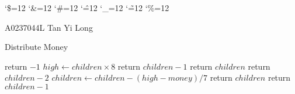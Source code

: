 \documentclass[a4paper,11pt]{article}
\newenvironment{simplechar}{%
   \catcode`\$=12
   \catcode`\&=12
   \catcode`\#=12
   \catcode`\^=12
   \catcode`\_=12
   \catcode`\~=12
   \catcode`\%=12
}{}
\begin{document}
\begin{simplechar}
    \noindent
    A0237044L\newline
    Tan Yi Long
\end{simplechar}

\begin{algorithm}
    \caption{Distribute Money}
    \begin{algorithmic}
        \State return $-1$
        \EndIf
        \State $high \leftarrow children \times 8$
        \State return $children - 1$
        \EndIf
        \State return $children$
        \EndIf
        \State return $children - 2$
        \EndIf
        \State $children \leftarrow children - (high - money) / 7$
        \State return $children$
        \Else
        \State return $children - 1$
        \EndIf
    \end{algorithmic}
\end{algorithm}
\end{document}
